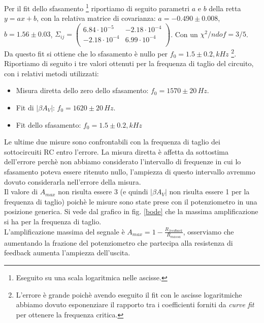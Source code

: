\documentclass[10pt,a4paper]{article}
\begin{document}
Per il fit dello sfasamento \footnote{Eseguito su una scala logaritmica nelle ascisse.} riportiamo di seguito parametri $a$ e $b$ della retta $y=ax+b$, con la relativa matrice di covarianza: $a = -0.490 \pm 0.008$, $b = 1.56\pm 0.03$,  $ \Sigma_{ij} = \left( \begin{array}{cc}
6.84 \cdot 10^{-5} & -2.18 \cdot 10^{-4} \\ 
-2.18 \cdot 10^{-4} & 6.99 \cdot 10^{-4}\\
\end{array} \right)$. Con un $\chi^2/ndof = 3/5$.\\

Da questo fit si ottiene che lo sfasamento è nullo per $f_0 = 1.5 \pm 0.2 , kHz$ \footnote{L'errore è grande poichè avendo eseguito il fit con le ascisse logaritmiche abbiamo dovuto esponenziare il rapporto tra i coefficienti forniti da \emph{curve fit} per ottenere la frequenza critica.}.\\

Riportiamo di seguito i tre valori ottenuti per la frequenza di taglio del circuito, con i relativi metodi utilizzati:\\

\begin{itemize}
\item Misura diretta dello zero dello sfasamento: $f_0 = 1570 \pm 20 \, Hz$.
\item Fit di $\vert \beta A_V \vert$: $f_0 = 1620 \pm 20 \, Hz$.
\item Fit dello sfasamento: $f_0 = 1.5 \pm 0.2 , kHz$
\end{itemize}

Le ultime due misure sono confrontabili con la frequenza di taglio dei sottocircuiti RC entro l'errore. La misura diretta è affetta da sottostima dell'errore perchè non abbiamo considerato l'intervallo di frequenze in cui lo sfasamento poteva essere ritenuto nullo, l'ampiezza di questo intervallo avremmo dovuto considerarla nell'errore della misura.\\

Il valore di $A_{max}$ non risulta essere 3 (e quindi $\vert \beta A_V \vert$ non risulta essere 1 per la frequenza di taglio) poichè le misure sono state prese con il potenziometro in una posizione generica. Si vede dal grafico in fig. \ref{bode} che la massima amplificazione si ha per la frequenza di taglio.\\

L'amplificazione massima del segnale è $A_{max} = 1 - \frac{R_{feedback}}{R_{massa}}$, osserviamo che aumentando la frazione del potenziometro che partecipa alla resistenza di feedback aumenta l'ampiezza dell'uscita.\\
\end{document}

